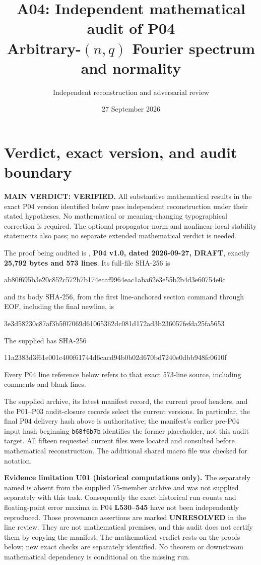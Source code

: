 \documentclass[11pt]{article}
\title{A04: Independent mathematical audit of P04\\Arbitrary-$(n,q)$ Fourier spectrum and normality}
\author{Independent reconstruction and adversarial review}
\date{27 September 2026}
\newcommand{\lin}[1]{\textbf{L#1}}
\newcommand{\sha}[2]{\par{\small\ttfamily #1\allowbreak #2}\par}
\begin{document}
\maketitle

\section{Verdict, exact version, and audit boundary}
\textbf{MAIN VERDICT: VERIFIED.}
All substantive mathematical results in the exact P04 version identified
below pass independent reconstruction under their stated hypotheses. No
mathematical or meaning-changing typographical correction is required.
The optional propagator-norm and nonlinear-local-stability statements also
pass; no separate extended mathematical verdict is needed.

The proof being audited is
,
\textbf{P04 v1.0, dated 2026-09-27, DRAFT}, exactly
\textbf{25,792 bytes and 573 lines}. Its full-file SHA-256 is
\sha{ab80f695b3e20c852c572b7b174ecaf99}{64eac1aba62e3e55b2b4d3e60754e0c}
and its body SHA-256, from the first line-anchored section command through
EOF, including the final newline, is
\sha{3e3d58230c87af3b5f07069d61065362d}{c081d172ad3b236057fefda25fa5653}
The supplied  has SHA-256
\sha{11a2383d3f61e001c400f61744d6cacd}{94b0b02d670bd7240e0dbb948fc0610f}
Every P04 line reference below refers to that exact 573-line source,
including comments and blank lines.

The supplied archive, its latest manifest record, the current proof headers,
and the P01--P03 audit-closure records select the current versions.
In particular, the final P04 delivery hash above is authoritative; the
manifest's earlier pre-P04 input hash beginning \texttt{b68f6b7b} identifies
the former placeholder, not this audit target. All fifteen requested current
files were located and consulted before mathematical reconstruction.
The additional shared macro file was checked for notation.

\textbf{Evidence limitation U01 (historical computations only).}
The separately named  is absent from the
supplied 75-member archive and was not supplied separately with this task.
Consequently the exact historical run counts and floating-point error
maxima in P04 \lin{530--545} have not been independently reproduced.
Those provenance assertions are marked \textbf{UNRESOLVED} in the line
review. They are not mathematical premises, and this audit does not
certify them by copying the manifest. The mathematical verdict rests on
the proofs below; new exact checks are separately identified. No theorem
or downstream mathematical dependency is conditional on the missing run.
\end{document}
